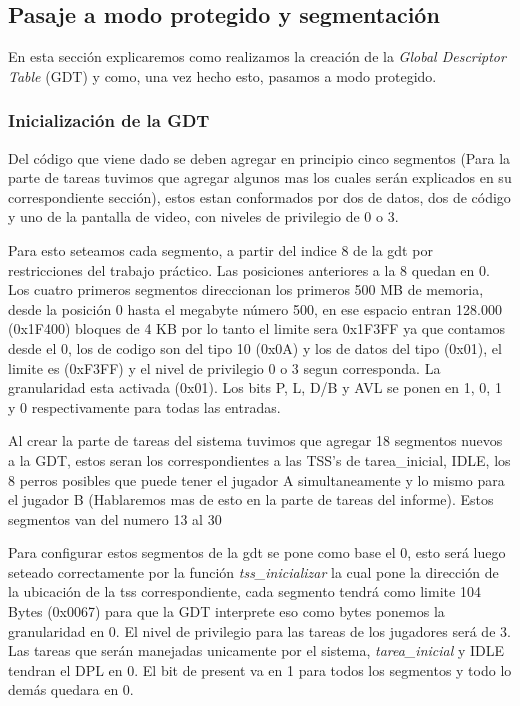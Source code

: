 \subsection{Pasaje a modo protegido y segmentación}
En esta sección explicaremos como realizamos la creación de la \textit{Global Descriptor Table} (GDT) y como, una vez hecho esto, pasamos a modo protegido.

\subsubsection{Inicialización de la GDT}
Del código que viene dado se deben agregar en principio cinco segmentos (Para la parte de tareas tuvimos que agregar algunos mas los cuales serán explicados en su correspondiente sección), estos estan conformados por dos de datos, dos de código y uno de la pantalla de video, con niveles de privilegio de 0 o 3.

Para esto seteamos cada segmento, a partir del indice 8 de la gdt por restricciones del trabajo práctico. Las posiciones anteriores a la 8 quedan en 0. Los cuatro primeros segmentos direccionan los primeros 500 MB de memoria, desde la posición 0 hasta el megabyte número 500, en ese espacio entran 128.000 (0x1F400) bloques de 4 KB por lo tanto el limite sera 0x1F3FF ya que contamos desde el 0, los de codigo son del tipo 10 (0x0A) y los de datos del tipo (0x01), el limite es (0xF3FF) y el nivel de privilegio 0 o 3 segun corresponda. La granularidad esta activada (0x01). Los bits P, L, D/B y AVL se ponen en 1, 0, 1 y 0 respectivamente para todas las entradas.



Al crear la parte de tareas del sistema tuvimos que agregar 18 segmentos nuevos a la GDT, estos seran los correspondientes a las TSS's de tarea\_inicial, IDLE, los 8 perros posibles que puede tener el jugador A simultaneamente y lo mismo para el jugador B (Hablaremos mas de esto en la parte de tareas del informe). Estos segmentos van del numero 13 al 30

Para configurar estos segmentos de la gdt se pone como base el 0, esto será luego seteado correctamente por la función \textit{tss\_inicializar} la cual pone la dirección de la ubicación de la tss correspondiente, cada segmento tendrá como limite 104 Bytes (0x0067) para que la GDT interprete eso como bytes ponemos la granularidad en 0. El nivel de privilegio para las tareas de los jugadores será de 3. Las tareas que serán manejadas unicamente por el sistema, \textit{tarea\_inicial} y IDLE tendran el DPL en 0. El bit de present va en 1 para todos los segmentos y todo lo demás quedara en 0. 

